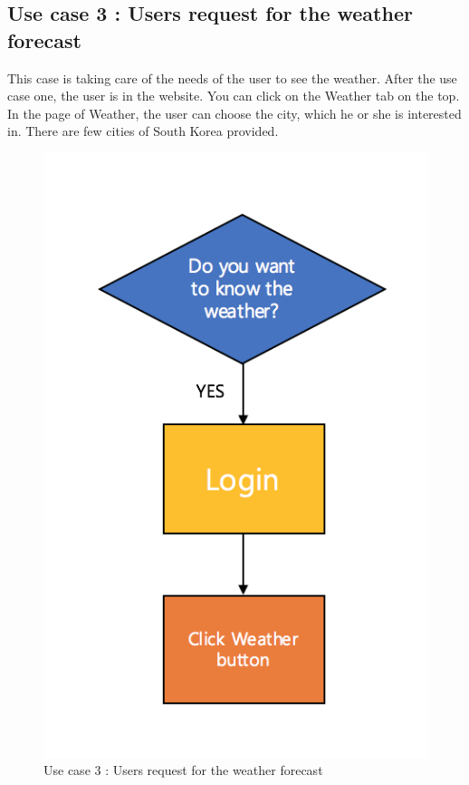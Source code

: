 \documentclass[conference]{IEEEtran}
\begin{document}
\subsection{Use case 3 : Users request for the weather forecast} This case is taking care of the needs of the user to see the weather. After the use case one, the user is in the website. You can click on the Weather tab on the top. In the page of Weather, the user can choose the city, which he or she is interested in. There are few cities of South Korea provided.
\begin{figure}[H]
\begin{center}
    \includegraphics[scale=0.8]{usecase3}
    \caption{Use case 3 : Users request for the weather forecast} \label{fig:label}
\end{center}
\end{figure}
\end{document}

